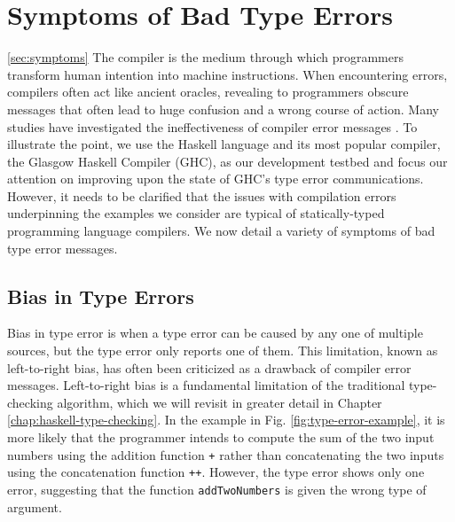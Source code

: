 \section{Symptoms of Bad Type Errors}
\ref{sec:symptoms}
 The compiler is the medium through which programmers transform human intention into machine instructions. When encountering errors, compilers often act like ancient oracles, revealing to programmers obscure messages that often lead to huge confusion and a wrong course of action. Many studies have investigated the ineffectiveness of compiler error messages \cite{Barik2017-gy, Becker2019-cs, Becker2016-kc}.  To illustrate the point, we use the Haskell language and its most popular compiler, the Glasgow Haskell Compiler (GHC), as our development testbed and focus our attention on improving upon the state of GHC's type error communications. However, it needs to be clarified that the issues with compilation errors underpinning the examples we consider are typical of statically-typed programming language compilers. We now detail a variety of symptoms of bad type error messages.



 \subsection{Bias in Type Errors} 
 \label{subsec:bias}
 Bias in type error is when a type error can be caused by any one of multiple sources, but the type error only reports one of them. This limitation, known as left-to-right bias, has often been criticized \cite{McAdam2002-vb, Lee1998-fx, Chen2014-ev} as a drawback of compiler error messages. Left-to-right bias is a fundamental limitation of the traditional type-checking algorithm, which we will revisit in greater detail in Chapter \ref{chap:haskell-type-checking}. In the example in Fig. \ref{fig:type-error-example}, it is more likely that the programmer intends to compute the sum of the two input numbers using the addition function \texttt{+} rather than concatenating the two inputs using the concatenation function \texttt{++}. However, the type error shows only one error, suggesting that the function \texttt{addTwoNumbers} is given the wrong type of argument. 

